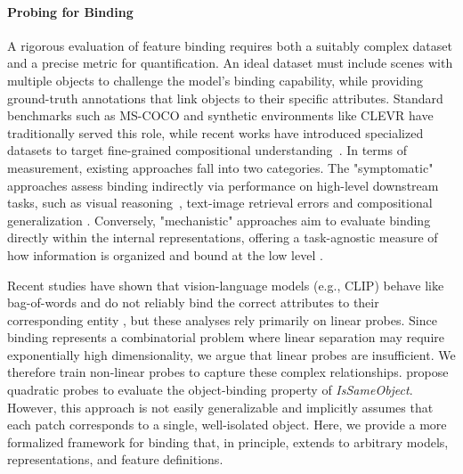 \documentclass{article}
\theoremstyle{plain}
\theoremstyle{definition}
\theoremstyle{remark}
\begin{document}
\paragraph{Probing for Binding}
A rigorous evaluation of feature binding requires both a suitably complex dataset and a precise metric for quantification. An ideal dataset must include scenes with multiple objects to challenge the model's binding capability, while providing ground-truth annotations that link objects to their specific attributes. Standard benchmarks such as MS-COCO \cite{lin2015microsoftcococommonobjects} and synthetic environments like CLEVR \cite{johnson2016clevrdiagnosticdatasetcompositional} have traditionally served this role, while recent works have introduced specialized datasets to target fine-grained compositional understanding~\cite{liu2024finecops}. In terms of measurement, existing approaches fall into two categories. The "symptomatic" approaches assess binding indirectly via performance on high-level downstream tasks, such as visual reasoning~\cite{campbell2025understandinglimitsvisionlanguage}, text-image retrieval errors \cite{yuksekgonul2023visionlanguagemodelsbehavelike} and compositional generalization \cite{lewis2024doesclipbindconcepts, pearson2025evaluatingcompositionalgeneralisationvlms}. Conversely, "mechanistic" approaches aim to evaluate binding directly within the internal representations, offering a task-agnostic measure of how information is organized and bound at the low level \cite{li2025doesobjectbindingnaturally}.

Recent studies have shown that vision-language models (e.g., CLIP) behave like bag-of-words and do not reliably bind the correct attributes to their corresponding entity \cite{koishigarina2025clipbehaveslikebagofwords, yuksekgonul2023visionlanguagemodelsbehavelike}, but these analyses rely primarily on linear probes. Since binding represents a combinatorial problem where linear separation may require exponentially high dimensionality, we argue that linear probes are insufficient. We therefore train non-linear probes to capture these complex relationships. 
\cite{li2025doesobjectbindingnaturally} propose quadratic probes to evaluate the object-binding property of \textit{IsSameObject}. However, this approach is not easily generalizable and implicitly assumes that each patch corresponds to a single, well-isolated object. Here, we provide a more formalized framework for binding that, in principle, extends to arbitrary models, representations, and feature definitions.
\end{document}
